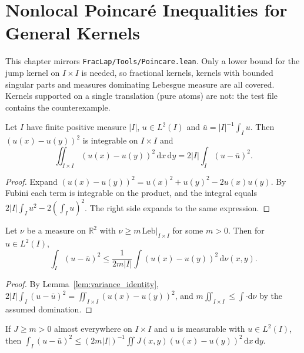 \chapter{Nonlocal Poincar\'e Inequalities for General Kernels}

This chapter mirrors \texttt{FracLap/Tools/Poincare.lean}. Only a lower bound for the jump kernel on $I \times I$ is needed, so fractional kernels, kernels with bounded singular parts and measures dominating Lebesgue measure are all covered. Kernels supported on a single translation (pure atoms) are not: the test file contains the counterexample.

\begin{lemma}\label{lem:variance_identity}
\leanok
Let $I$ have finite positive measure $\lvert I\rvert$, $u \in L^2(I)$ and $\bar u = \lvert I\rvert^{-1}\int_I u$. Then $(u(x) - u(y))^2$ is integrable on $I \times I$ and
\[
  \iint_{I \times I} (u(x) - u(y))^2\, \mathrm{d}x\, \mathrm{d}y = 2 \lvert I\rvert \int_I (u - \bar u)^2.
\]
\end{lemma}

\begin{proof}
\leanok
Expand $(u(x) - u(y))^2 = u(x)^2 + u(y)^2 - 2u(x)u(y)$. By Fubini each term is integrable on the product, and the integral equals $2\lvert I\rvert \int_I u^2 - 2(\int_I u)^2$. The right side expands to the same expression.
\end{proof}

\begin{theorem}\label{thm:poincare_measure}
\leanok
Let $\nu$ be a measure on $\mathbb{R}^2$ with $\nu \ge m\, \mathrm{Leb}|_{I \times I}$ for some $m > 0$. Then for $u \in L^2(I)$,
\[
  \int_I (u - \bar u)^2 \le \frac{1}{2 m \lvert I\rvert} \int (u(x) - u(y))^2\, \mathrm{d}\nu(x, y).
\]
\end{theorem}

\begin{proof}
\leanok
By Lemma~\ref{lem:variance_identity}, $2\lvert I\rvert \int_I (u - \bar u)^2 = \iint_{I \times I}(u(x) - u(y))^2$, and $m \iint_{I \times I} \le \int \cdot \mathrm{d}\nu$ by the assumed domination.
\end{proof}

\begin{theorem}\label{thm:poincare_kernel}
\leanok
If $J \ge m > 0$ almost everywhere on $I \times I$ and $u$ is measurable with $u \in L^2(I)$, then $\int_I (u - \bar u)^2 \le (2m\lvert I\rvert)^{-1} \iint J(x, y) (u(x) - u(y))^2\, \mathrm{d}x\, \mathrm{d}y$.
\end{theorem}

